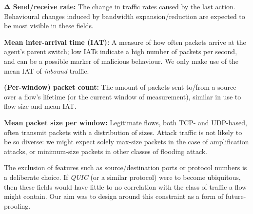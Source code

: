 \documentclass[10pt, times, conference, letterpaper]{IEEEtran}
\newcommand{\fakepara}[1]{\noindent\textbf{#1:}}
\begin{document}
\fakepara{$\mathbf{\Delta}$ Send/receive rate}
The change in traffic rates caused by the last action.
Behavioural changes induced by bandwidth expansion/reduction are expected to be most visible in these fields.

\fakepara{Mean inter-arrival time (IAT)}
A measure of how often packets arrive at the agent's parent switch; low IATs indicate a high number of packets per second, and can be a possible marker of malicious behaviour.
We only make use of the mean IAT of \emph{inbound} traffic.

\fakepara{(Per-window) packet count}
The amount of packets sent to/from a source over a flow's lifetime (or the current window of measurement), similar in use to flow size and mean IAT.

\fakepara{Mean packet size per window}
Legitimate flows, both TCP- and UDP-based, often transmit packets with a distribution of sizes.
Attack traffic is not likely to be so diverse: we might expect solely max-size packets in the case of amplification attacks, or minimum-size packets in other classes of flooding attack.

The exclusion of features such as source/destination ports or protocol numbers is a deliberate choice.
If \emph{QUIC} (or a similar protocol) were to become ubiquitous, then these fields would have little to no correlation with the class of traffic a flow might contain.
Our aim was to design around this constraint as a form of future-proofing.

\begin{table}
	\centering
	\caption{Tile coding windows for each feature.\label{tab:codings}}
	
	\vspace{-1em}
\end{table}
\end{document}
